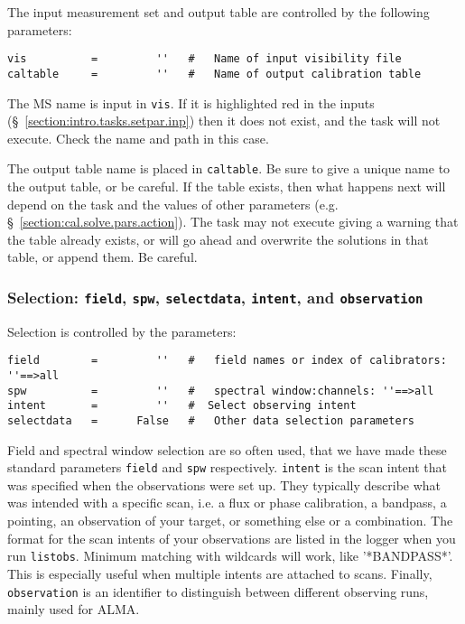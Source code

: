 The input measurement set and output table are
controlled by the following parameters:
\small
\begin{verbatim}
vis          =         ''   #   Name of input visibility file
caltable     =         ''   #   Name of output calibration table
\end{verbatim}
\normalsize

The MS name is input in {\tt vis}.  If it is highlighted red
in the inputs (\S~\ref{section:intro.tasks.setpar.inp}) then it 
does not exist, and the task will not execute.  Check the name and
path in this case. 

The output table name is placed in {\tt caltable}.  Be sure to give a
unique name to the output table, or be careful.  If the table exists,
then what happens next will depend on the task and the values of other
parameters (e.g.  \S~\ref{section:cal.solve.pars.action}).  The task
may not execute giving a warning that the table already exists, or
will go ahead and overwrite the solutions in that table, or append
them.  Be careful.

\subsubsection{Selection: {\tt field}, {\tt spw}, {\tt selectdata},
  {\tt intent}, and {\tt observation} }
\label{section:cal.solve.pars.select}

Selection is controlled by the parameters:
\small
\begin{verbatim}
field        =         ''   #   field names or index of calibrators: ''==>all
spw          =         ''   #   spectral window:channels: ''==>all 
intent       =         ''   #  Select observing intent
selectdata   =      False   #   Other data selection parameters
\end{verbatim}
\normalsize

Field and spectral window selection are so often used, that we have
made these standard parameters {\tt field} and {\tt spw}
respectively. {\tt intent} is the scan intent that was specified when
the observations were set up. They typically describe what was
intended with a specific scan, i.e. a flux or phase calibration, a
bandpass, a pointing, an observation of your target, or something else
or a combination. The format for the scan intents of your observations
are listed in the logger when you run {\tt listobs}. Minimum matching
with wildcards will work, like '*BANDPASS*'. This is especially useful
when multiple intents are attached to scans.  Finally, {\tt
  observation} is an identifier to distinguish between different
observing runs, mainly used for ALMA.

